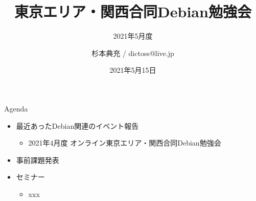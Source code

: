 \title{東京エリア・関西合同Debian勉強会}
\subtitle{2021年5月度} %
\author{杉本典充 / dictoss@live.jp}
\date{2021年5月15日}



\begin{frame}
\titlepage{}
\end{frame}

\begin{frame}{Agenda}
 \begin{minipage}[t]{0.45\hsize}
  \begin{itemize}
  \item 最近あったDebian関連のイベント報告
    \begin{itemize}
    \item 2021年4月度 オンライン東京エリア・関西合同Debian勉強会
    \end{itemize}
  \item 事前課題発表
  \end{itemize}
 \end{minipage}
 \begin{minipage}[t]{0.45\hsize}
   \begin{itemize}
   \item セミナー
     \begin{itemize}
     \item xxx
     \end{itemize}
  \end{itemize}
 \end{minipage}
\end{frame}

